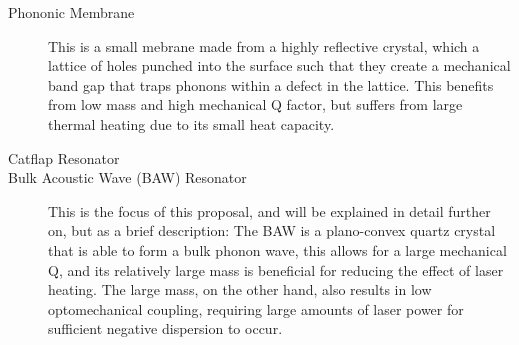 \documentclass[aps,
                pra,  
                a4paper, 
                amsmath, 
                amssymb, 
                preprint,
                amsfonts,
                nofootinbib,
                titlepage
            ]{revtex4-2}
\begin{document}
    \begin{description}
        \item[Phononic Membrane] This is a small mebrane made from a highly reflective crystal, which a lattice of holes punched into the surface such that they create a mechanical band gap that traps phonons within a defect in the lattice. This benefits from low mass and high mechanical Q factor, but suffers from large thermal heating due to its small heat capacity.
        \item[Catflap Resonator] %
        \item[Bulk Acoustic Wave (BAW) Resonator] This is the focus of this proposal, and will be explained in detail further on, but as a brief description: The BAW is a plano-convex quartz crystal that is able to form a bulk phonon wave, this allows for a large mechanical Q, and its relatively large mass is beneficial for reducing the effect of laser heating. The large mass, on the other hand, also results in low optomechanical coupling, requiring large amounts of laser power for sufficient negative dispersion to occur.
    \end{description}
    
\end{document}
